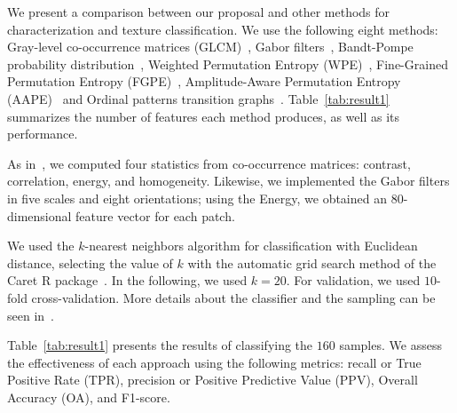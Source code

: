 \documentclass[journal]{IEEEtran}
\begin{document}
	We present a comparison between our proposal and other methods for characterization and texture classification.
	We use the following eight methods: 
	Gray-level co-occurrence matrices (GLCM)~\cite{kourgli2012texture}, 
	Gabor filters~\cite{weldon1996efficient},  
	Bandt-Pompe probability distribution~\cite{Bandt2002Permutation}, 
	Weighted Permutation Entropy (WPE)~\cite{Fadlallah2013Weightedpermutation},
	Fine-Grained Permutation Entropy (FGPE)~\cite{xiao2009fine}, 
	Amplitude-Aware Permutation Entropy (AAPE)~\cite{azami2016amplitude} and 
	Ordinal patterns transition graphs~\cite{Borges2019Transition}.
	Table~\ref{tab:result1} summarizes the number of features each method produces, as well as its performance.
	
	As in~\cite{guan2019covariance}, 
	we computed four statistics from co-occurrence matrices: contrast, correlation, energy, and homogeneity.
	Likewise, we implemented the Gabor filters in five scales and eight orientations; using the Energy, we obtained an $80$-dimensional feature vector for each patch.
	
	
	We used the $k$-nearest neighbors algorithm for classification with Euclidean distance, selecting the value of $k$ with the automatic grid search method of the Caret R package~\cite{kuhn2008building}.
	In the following, we used $k = 20$.
	For validation, we used $10$-fold cross-validation.
	More details about the classifier and the sampling can be seen in~\cite{mitchell1997machine}.
	
	Table~\ref{tab:result1} presents the results of classifying the $160$ samples.
	We assess the effectiveness of each approach using the following metrics: recall or True Positive Rate (TPR), precision or Positive Predictive Value (PPV), Overall Accuracy (OA), and F1-score.
	
\end{document}
